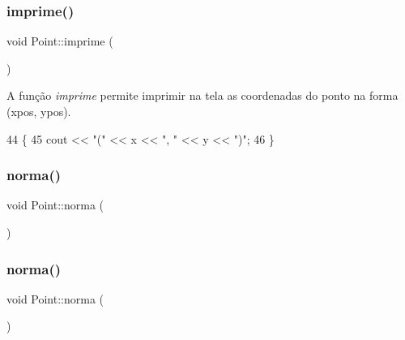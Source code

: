 \mbox{\label{class_point_a1fb5c2501c27ab2cbc99d06c2a26a741}} 
\subsubsection{\texorpdfstring{imprime()}{imprime()}\hspace{0.1cm}{\footnotesize\ttfamily [2/2]}}
{\footnotesize\ttfamily void Point\+::imprime (\begin{DoxyParamCaption}{ }\end{DoxyParamCaption})}



A função {\itshape imprime} permite imprimir na tela as coordenadas do ponto na forma (xpos, ypos). 


\begin{DoxyCode}
44                    \{
45        cout << \textcolor{stringliteral}{"("} << x << \textcolor{stringliteral}{", "} << y << \textcolor{stringliteral}{")"};
46 \}
\end{DoxyCode}
\mbox{\label{class_point_a6233714649b03294a020827fb53eb8ad}} 
\subsubsection{\texorpdfstring{norma()}{norma()}\hspace{0.1cm}{\footnotesize\ttfamily [1/2]}}
{\footnotesize\ttfamily void Point\+::norma (\begin{DoxyParamCaption}{ }\end{DoxyParamCaption})}

\mbox{\label{class_point_a6233714649b03294a020827fb53eb8ad}} 
\subsubsection{\texorpdfstring{norma()}{norma()}\hspace{0.1cm}{\footnotesize\ttfamily [2/2]}}
{\footnotesize\ttfamily void Point\+::norma (\begin{DoxyParamCaption}{ }\end{DoxyParamCaption})}



